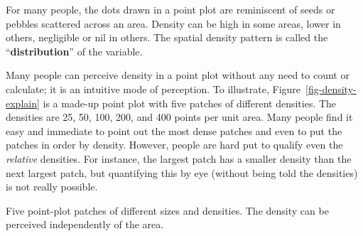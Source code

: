 \documentclass[
  letterpaper,
  DIV=11,
  numbers=noendperiod,
  oneside]{scrartcl}
\begin{document}
For many people, the dots drawn in a point plot are reminiscent of seeds
or pebbles scattered across an area.
{} Density can be high in
some areas, lower in others, negligible or nil in others. The spatial
density pattern is called the ``\textbf{distribution}'' of the variable.

Many people can perceive density in a point plot without any need to
count or calculate; it is an intuitive mode of perception. To
illustrate, Figure~\ref{fig-density-explain} is a made-up point plot
with five patches of different densities. The densities are 25, 50, 100,
200, and 400 points per unit area. Many people find it easy and
immediate to point out the most dense patches and even to put the
patches in order by density. However, people are hard put to qualify
even the \emph{relative} densities. For instance, the largest patch has
a smaller density than the next largest patch, but quantifying this by
eye (without being told the densities) is not really possible.

\begin{marginfigure}


\caption{\label{fig-density-explain}Five point-plot patches of different
sizes and densities. The density can be perceived independently of the
area.}

\end{marginfigure}%
\end{document}
